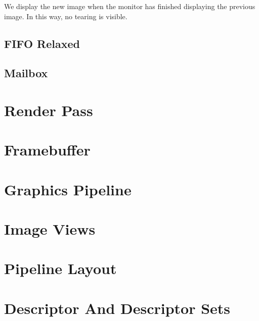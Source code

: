 We display the new image when the monitor has finished displaying the
previous image.
In this way, no tearing is visible.


\subsection{FIFO Relaxed}

\subsection{Mailbox}

\section{Render Pass}

\section{Framebuffer}

\section{Graphics Pipeline}

\section{Image Views}

\section{Pipeline Layout}

\section{Descriptor And Descriptor Sets}
